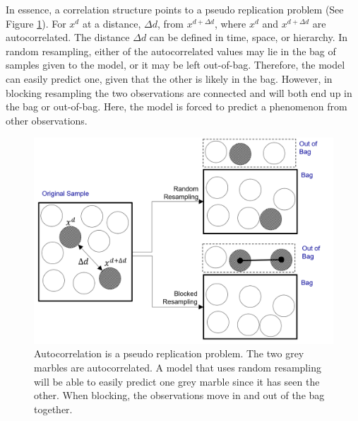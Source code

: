 
In essence, a correlation structure points to a pseudo replication problem (See Figure \ref{fig:marbles}). For $x^d$ at a distance, $\Delta d$, from $x^{d+\Delta d}$, where $x^d$ and $x^{d+\Delta d}$ are autocorrelated. The distance $\Delta d$ can be defined in time, space, or hierarchy. In random resampling, either of the autocorrelated values may lie in the bag of samples given to the model, or it may be left out-of-bag. Therefore, the model can easily predict one, given that the other is likely in the bag. However, in blocking resampling the two observations are connected and will both end up in the bag or out-of-bag. Here, the model is forced to predict a phenomenon from other observations. 

\begin{figure}[ht]
	\centering
	\includegraphics[width=15cm,trim={0 0 0 0},clip=true]{plots/resampling.png}
	\caption{Autocorrelation is a pseudo replication problem. The two grey marbles are autocorrelated. A model that uses random resampling will be able to easily predict one grey marble since it has seen the other. When blocking, the observations move in and out of the bag together.} 
	\label{fig:marbles}
\end{figure}

